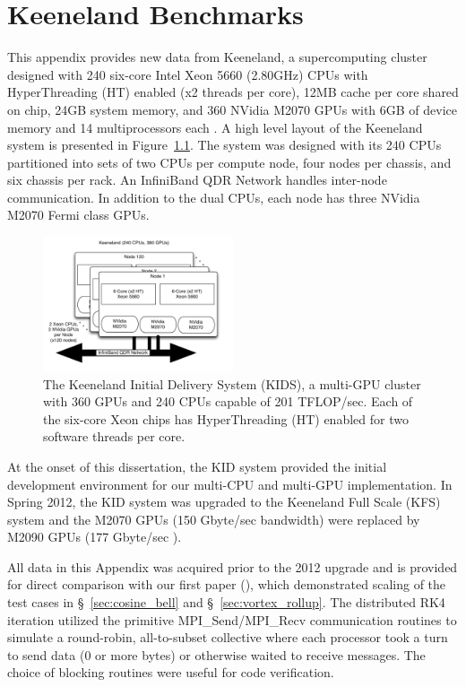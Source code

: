 
\chapter{Keeneland Benchmarks}
\label{app:keeneland_alltoallv_benchmarks}

This appendix provides new data from Keeneland, a supercomputing cluster designed with 240 six-core Intel Xeon 5660 (2.80GHz) CPUs with HyperThreading (HT) enabled (x2 threads per core), 12MB cache per core shared on chip, 24GB system memory, and 360 NVidia M2070 GPUs with 6GB of device memory and 14 multiprocessors each \cite{Vetter2011}.  A high level layout of the Keeneland system is presented in Figure~\ref{fig:keeneland}. The system was designed with its 240 CPUs partitioned into sets of two CPUs per compute node, four nodes per chassis, and six chassis per rack. An InfiniBand QDR Network handles inter-node communication. In addition to the dual CPUs, each node has three NVidia M2070 Fermi class GPUs.

\begin{figure}
\centering
\includegraphics[width=0.5\textwidth]{../figures/omnigraffle/Keeneland.pdf}
\caption{The Keeneland Initial Delivery System (KIDS), a multi-GPU cluster with 360 GPUs and 240 CPUs capable of 201 TFLOP/sec. Each of the six-core Xeon chips has HyperThreading (HT) enabled for two software threads per core.}
\label{fig:keeneland}
\end{figure}

At the onset of this dissertation, the KID system provided the initial development environment for our multi-CPU and multi-GPU implementation. In Spring 2012, the KID system was upgraded to the Keeneland Full Scale (KFS) system and the M2070 GPUs (150 Gbyte/sec bandwidth) were replaced by M2090 GPUs (177 Gbyte/sec \cite{M2090}). 

All data in this Appendix was acquired prior to the 2012 upgrade and is provided for direct comparison with our first paper (\cite{BolligFlyerErlebacher2012}), which demonstrated scaling of the test cases in \S~\ref{sec:cosine_bell} and \S~\ref{sec:vortex_rollup}. The distributed RK4 iteration utilized the primitive MPI\_Send/MPI\_Recv communication routines to simulate a round-robin, all-to-subset collective where each processor took a turn to send data (0 or more bytes) or otherwise waited to receive messages. The choice of blocking routines were useful for code verification. 

